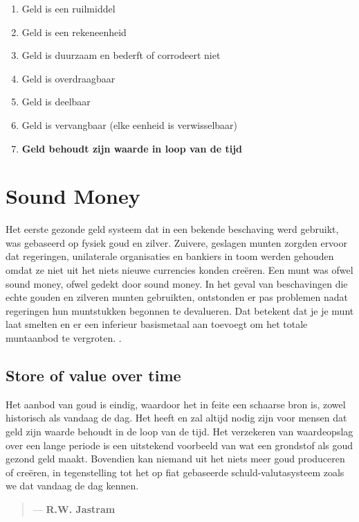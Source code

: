 \begin{enumerate}[label=(\alph*)]
    \setlength\itemsep{0em}
    \item Geld is een ruilmiddel
    \item Geld is een rekeneenheid
    \item Geld is duurzaam en bederft of corrodeert niet
    \item Geld is overdraagbaar
    \item Geld is deelbaar
    \item Geld is vervangbaar (elke eenheid is verwisselbaar)
    \item \textbf{Geld behoudt zijn waarde in loop van de tijd}
\end{enumerate}

\section{Sound Money}
Het eerste gezonde geld systeem dat in een bekende beschaving werd gebruikt, was gebaseerd op fysiek goud en zilver. Zuivere, geslagen munten zorgden ervoor dat regeringen, unilaterale organisaties en bankiers in toom werden gehouden omdat ze niet uit het niets nieuwe currencies konden cre\"eren. Een munt was ofwel sound money, ofwel gedekt door sound money. In het geval van beschavingen die echte gouden en zilveren munten gebruikten, ontstonden er pas problemen nadat regeringen hun muntstukken begonnen te devalueren. Dat betekent dat je je munt laat smelten en er een inferieur basismetaal aan toevoegt om het totale muntaanbod te vergroten. \parencite{goldsilver_ep1}.

\subsection{Store of value over time}
Het aanbod van goud is eindig, waardoor het in feite een schaarse bron is, zowel historisch als vandaag de dag. Het heeft en zal altijd nodig zijn voor mensen dat geld zijn waarde behoudt in de loop van de tijd. Het verzekeren van waardeopslag over een lange periode is een uitstekend voorbeeld van wat een grondstof als goud gezond geld maakt. Bovendien kan niemand uit het niets meer goud produceren of creëren, in tegenstelling tot het op fiat gebaseerde schuld-valutasysteem zoals we dat vandaag de dag kennen.


\begin{quotation}

      \textit{}
      \begin{flushright}
        \small{--- \textbf{R.W. Jastram}}
      \end{flushright}
    
\end{quotation}




